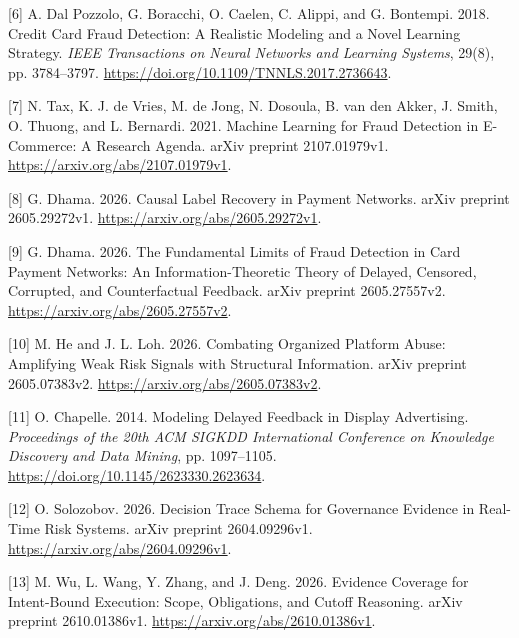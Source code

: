 \documentclass[acmlarge,nonacm]{acmart}
\newlength{\cslhangindent}
\newlength{\cslentryspacingunit} %
\newenvironment{CSLReferences}[2] %
 {\bibliofont %
  \setlength{\parindent}{0pt}
  \ifodd #1
  \let\oldpar\par
  \def\par{\hangindent=\cslhangindent\oldpar}
  \fi
  \setlength{\parskip}{#2\cslentryspacingunit}
 }%
 {}
\begin{document}
\begin{CSLReferences}{1}{1}
\leavevmode{}%
{[}6{]} A. Dal Pozzolo, G. Boracchi, O. Caelen, C. Alippi, and G.
Bontempi. 2018. Credit Card Fraud Detection: A Realistic Modeling and a
Novel Learning Strategy. \emph{IEEE Transactions on Neural Networks and
Learning Systems}, 29(8), pp. 3784--3797.
\url{https://doi.org/10.1109/TNNLS.2017.2736643}.

\leavevmode{}%
{[}7{]} N. Tax, K. J. de Vries, M. de Jong, N. Dosoula, B. van den
Akker, J. Smith, O. Thuong, and L. Bernardi. 2021. Machine Learning for
Fraud Detection in E-Commerce: A Research Agenda. arXiv preprint
2107.01979v1. \url{https://arxiv.org/abs/2107.01979v1}.

\leavevmode{}%
{[}8{]} G. Dhama. 2026. Causal Label Recovery in Payment Networks. arXiv
preprint 2605.29272v1. \url{https://arxiv.org/abs/2605.29272v1}.

\leavevmode{}%
{[}9{]} G. Dhama. 2026. The Fundamental Limits of Fraud Detection in
Card Payment Networks: An Information-Theoretic Theory of Delayed,
Censored, Corrupted, and Counterfactual Feedback. arXiv preprint
2605.27557v2. \url{https://arxiv.org/abs/2605.27557v2}.

\leavevmode{}%
{[}10{]} M. He and J. L. Loh. 2026. Combating Organized Platform Abuse:
Amplifying Weak Risk Signals with Structural Information. arXiv preprint
2605.07383v2. \url{https://arxiv.org/abs/2605.07383v2}.

\leavevmode{}%
{[}11{]} O. Chapelle. 2014. Modeling Delayed Feedback in Display
Advertising. \emph{Proceedings of the 20th ACM SIGKDD International
Conference on Knowledge Discovery and Data Mining}, pp. 1097--1105.
\url{https://doi.org/10.1145/2623330.2623634}.

\leavevmode{}%
{[}12{]} O. Solozobov. 2026. Decision Trace Schema for Governance
Evidence in Real-Time Risk Systems. arXiv preprint 2604.09296v1.
\url{https://arxiv.org/abs/2604.09296v1}.

\leavevmode{}%
{[}13{]} M. Wu, L. Wang, Y. Zhang, and J. Deng. 2026. Evidence Coverage
for Intent-Bound Execution: Scope, Obligations, and Cutoff Reasoning.
arXiv preprint 2610.01386v1. \url{https://arxiv.org/abs/2610.01386v1}.


\end{CSLReferences}
\end{document}
